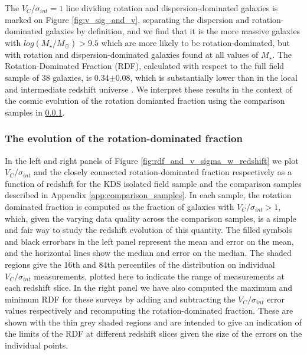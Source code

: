 \documentclass[fleqn,usenatbib]{mnras}
\begin{document}
The $V_{C}$/$\sigma_{int}=1$ line dividing rotation and dispersion-dominated galaxies is marked on Figure \ref{fig:v_sig_and_v}, separating the dispersion and rotation-dominated galaxies by definition, and we find that it is the more massive galaxies with $log(M_{\star}/M_{\odot}) > 9.5$ which are more likely to be rotation-dominated, but with rotation and dispersion-dominated galaxies found at all values of $M_{\star}$.
The Rotation-Dominated Fraction (RDF), calculated with respect to the full field sample of 38 galaxies, is 0.34$\pm0.08$, which is substantially lower than in the local and intermediate redshift universe \citep[e.g.][]{Epinat2008a,Epinat2008,Green2014}.
We interpret these results in the context of the cosmic evolution of the rotation domianted fraction using the comparison samples in \cref{subsubsec:RDF_evolution}.\\

\subsubsection{The evolution of the rotation-dominated fraction}\label{subsubsec:RDF_evolution}

In the left and right panels of Figure \ref{fig:rdf_and_v_sigma_w_redshift} we plot $V_{C}/\sigma_{int}$ and the closely connected rotation-dominated fraction respectively as a function of redshift for the KDS isolated field sample and the comparison samples described in Appendix \ref{app:comparison_samples}.
In each sample, the rotation dominated fraction is computed as the fraction of galaxies with $V_{C}/\sigma_{int} > 1$, which, given the varying data quality across the comparison samples, is a simple and fair way to study the redshift evolution of this quantity. 
The filled symbols and black errorbars in the left panel represent the mean and error on the mean, and the horizontal lines show the median and error on the median.
The shaded regions give the 16th and 84th percentiles of the distribution on individual $V_{C}/\sigma_{int}$ measurements, plotted here to indicate the range of measurements at each redshift slice.
In the right panel we have also computed the maximum and minimum RDF for these surveys by adding and subtracting the $V_{C}/\sigma_{int}$ error values respectively and recomputing the rotation-dominated fraction.
These are shown with the thin grey shaded regions and are intended to give an indication of the limits of the RDF at different redshift slices given the size of the errors on the individual points.\\
\end{document}
